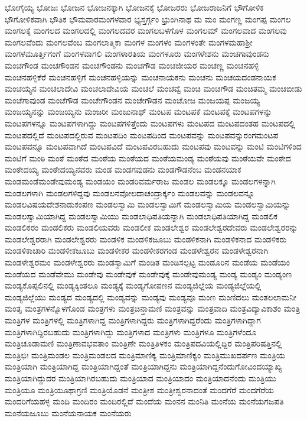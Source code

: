 {ಭೋಗೈಯ್ಯ
ಭೋಜಃ
ಭೋಜನ
ಭೋಜನಕ್ಕಾಗಿ
ಭೋಜನಕ್ಕೆ
ಭೋಜರರು
ಭೋಜರಾಜನಿಗೆ
ಭೌಗೋಳಿಕ
ಭೌಗೋಳಿಕವಾಗಿ
ಭೌತಿಕ
ಭೌಮವಾರಮಂಗಳವಾರ
ಭ್ಯಸ್ತರ್ಗ್ಗಂ
ಭ್ರುಂಗಿನಾಥ
ಮ
ಮಂ
ಮಂಗಣ್ಣ
ಮಂಗಪ್ಪ
ಮಂಗಲ
ಮಂಗಲಕ್ಕೆ
ಮಂಗಲದ
ಮಂಗಲದಲ್ಲಿ
ಮಂಗಲದವರ
ಮಂಗಲಬಳಗೊಳ
ಮಂಗಲಮ್
ಮಂಗಲವಾದ
ಮಂಗಲವು
ಮಂಗಲವೆಂದು
ಮಂಗಲವೆಂಬ
ಮಂಗಲಾತ್ಮಿಕಾ
ಮಂಗಳ
ಮಂಗಳಂ
ಮಂಗಳಂತೇ
ಮಂಗಳಮಹಾಶ್ರೀ
ಮಂಗಳಮೂರ್ತ್ತಿಗಂಗೆ
ಮಂಗಳವಾಗಲಿ
ಮಂಗಳಾರತಿಯ
ಮಂಗಳೂರು
ಮಂಗಳೇಶನು
ಮಂಚಗಾವುಂಡನು
ಮಂಚಗೌಂಡ
ಮಂಚಗೌಂಡನ
ಮಂಚಗೌಂಡನು
ಮಂಚಗೌಡ
ಮಂಚಜೀಯರ
ಮಂಚಣ್ಣ
ಮಂಚನಹಳ್ಳಿ
ಮಂಚನಹಳ್ಳಿಕೆರೆ
ಮಂಚನಹಳ್ಳಿಗೆ
ಮಂಚನಹಳ್ಳಿಯನ್ನು
ಮಂಚನಾಯಕನು
ಮಂಚನು
ಮಂಚಯದಂಡನಾಯಕ
ಮಂಚಯ್ಯನ
ಮಂಚಲಾದೇವಿ
ಮಂಚಲಾದೇವಿಯ
ಮಂಚಲೆ
ಮಂಚವ್ವೆ
ಮಂಚಿ
ಮಂಚಿಗೌಡ
ಮಂಚಿತಮ್ಮ
ಮಂಚಿಬೀಡು
ಮಂಚೆಗಾವುಂಡ
ಮಂಚೆಗೌಡ
ಮಂಚೇಗೌಂಡನ
ಮಂಚೇಗೌಡನ
ಮಂಚೋಜ
ಮಂಜಯಪ್ಪ
ಮಂಜಯ್ಯ
ಮಂಜಯ್ಯನನ್ನು
ಮಂಜಯ್ಯನು
ಮಂಜರೀ
ಮಂಜುನಾಥ್
ಮಂಟಪ
ಮಂಟಪಕೆ
ಮಂಟಪಕ್ಕೆ
ಮಂಟಪಗಳನ್ನು
ಮಂಟಪಗಳನ್ನೂ
ಮಂಟಪಗಳಾಗಿದ್ದು
ಮಂಟಪಗಳಿತ್ತೆಂದು
ಮಂಟಪಗಳು
ಮಂಟಪದ
ಮಂಟಪದಂತಹ
ಮಂಟಪದಲ್ಲಿ
ಮಂಟಪದಲ್ಲಿದೆ
ಮಂಟಪದಲ್ಲಿರುವ
ಮಂಟಪದಿಂ
ಮಂಟಪದಿಂದ
ಮಂಟಪವನ್ನು
ಮಂಟಪವನ್ನುರಂಗಮಂಟಪ
ಮಂಟಪವನ್ನೂ
ಮಂಟಪವಾಗಿದೆ
ಮಂಟಪವಿದೆ
ಮಂಟಪವಿರಬಹುದು
ಮಂಟಪವು
ಮಂಟವನ್ನು
ಮಂಟಿ
ಮಂಟಿಗಳಿಂದ
ಮಂಟಿಗೆ
ಮಂಠಿ
ಮಂಠೆ
ಮಂಠೆದ
ಮಂಠೆಯ
ಮಂಠೆಯದ
ಮಂಠೆಯಮಂಡ್ಯ
ಮಂಠೆಯವು
ಮಂಠೆಯವೇ
ಮಂಠೇದ
ಮಂಠೇದಯ್ಯ
ಮಂಠೇದಯ್ಯನವರು
ಮಂಡ
ಮಂಡಗವುಡನು
ಮಂಡಗೌಡನೆಂಬ
ಮಂಡನಯಾಕ
ಮಂಡಮಂಡೆಮಂಡೇವುಮಂಡ್ಯ
ಮಂಡಯಂ
ಮಂಡರಿವರ್ಮರಾಜ
ಮಂಡಲ
ಮಂಡಲಕ್ಕೂ
ಮಂಡಲಗಳನ್ನಾಗಿ
ಮಂಡಲಗಳಾಗಿ
ಮಂಡಲಗಳಿದ್ದವು
ಮಂಡಲನವೋಲದಾಚಂದ್ರಾರ್ಕ್ಕಂ
ಮಂಡಲವನ್ನು
ಮಂಡಲವನ್ನೂ
ಮಂಡಲವಿಷಯದೇಶನಾಡುಕಂಪಣ
ಮಂಡಲಸ್ವಾಮಿ
ಮಂಡಲಸ್ವಾಮಿಗೆ
ಮಂಡಲಸ್ವಾಮಿಯ
ಮಂಡಲಸ್ವಾಮಿಯನ್ನು
ಮಂಡಲಸ್ವಾಮಿಯಾಗಿದ್ದ
ಮಂಡಲಸ್ವಾಮಿಯು
ಮಂಡಲಾಧಿಪತಿಯನ್ನಾಗಿ
ಮಂಡಲಾಧಿಪತಿಯಾಗಿದ್ದ
ಮಂಡಲಿಕ
ಮಂಡಲಿಕರಂ
ಮಂಡಲಿಕರು
ಮಂಡಲಿಯವರು
ಮಂಡಲೀಕ
ಮಂಡಲೇಶ್ವರ
ಮಂಡಲೇಶ್ವರದೇವರು
ಮಂಡಲೇಶ್ವರರನ್ನು
ಮಂಡಲೇಶ್ವರರಾಗಿ
ಮಂಡಲೇಶ್ವರರು
ಮಂಡಳಿಕ
ಮಂಡಳಿಕಜೂಬು
ಮಂಡಳಿಕನಾಗಿ
ಮಂಡಳಿಕನಾದ
ಮಂಡಳಿಕರು
ಮಂಡಳಿಕಾಚಾರಿ
ಮಂಡಳೀಕಜೂಬು
ಮಂಡಳೀಕರ
ಮಂಡಳೀಕರಗಂಡ
ಮಂಡಳೇಶ್ವರನ
ಮಂಡಳೇಶ್ವರನಾಗಿ
ಮಂಡಳೇಶ್ವರಮಂ
ಮಂಡಳೇಶ್ವರರು
ಮಂಡಸ್ವಾಮಿಗೆ
ಮಂಡಿತ
ಮಂಡಿಸಲ್ಪಟ್ಟ
ಮಂಡೂರಿನ
ಮಂಡೆಯ
ಮಂಡೆಯಂ
ಮಂಡೆಯದ
ಮಂಡೆವೇಮು
ಮಂಡೇವು
ಮಂಡೇವುಕೆ
ಮಂಡೇವುಕ್ಕೆ
ಮಂಡೇವುಮಂಡ್ಯ
ಮಂಡ್ಯ
ಮಂಡ್ಯಂ
ಮಂಡ್ಯಂಣ
ಮಂಡ್ಯಕೊಪ್ಪಲಿನಲ್ಲಿ
ಮಂಡ್ಯಕ್ಕಿಂತಲೂ
ಮಂಡ್ಯಕ್ಕೆ
ಮಂಡ್ಯಗೋಪಣನ
ಮಂಡ್ಯಜಿಲ್ಲೆಯ
ಮಂಡ್ಯಜಿಲ್ಲೆಯಲ್ಲಿ
ಮಂಡ್ಯಜಿಲ್ಲೆಯು
ಮಂಡ್ಯದ
ಮಂಡ್ಯದಲ್ಲಿ
ಮಂಡ್ಯವನ್ನು
ಮಂಡ್ಯವು
ಮಂಡ್ಯವೂ
ಮಂಣ
ಮಂಣಿದಲು
ಮಂತಲಲಾಮನೀ
ಮಂತೃ
ಮಂತ್ರಗಳನ್ನೊಳಗೊಂಡ
ಮಂತ್ರಗಳು
ಮಂತ್ರಚಿನ್ತಾಮಣಿ
ಮಂತ್ರವನ್ನು
ಮಂತ್ರವಾದಿ
ಮಂತ್ರವಿದ್ಯಾವಿಕಾಶಂ
ಮಂತ್ರಿ
ಮಂತ್ರಿಗಳ
ಮಂತ್ರಿಗಳಲ್ಲಿ
ಮಂತ್ರಿಗಳಾಗಿದ್ದ
ಮಂತ್ರಿಗಳಾಗಿದ್ದರು
ಮಂತ್ರಿಗಳಾಗಿದ್ದರೆಂದು
ಮಂತ್ರಿಗಳಾಗಿದ್ದಾಗ
ಮಂತ್ರಿಗಳಾಗಿದ್ದಿರಬಹುದು
ಮಂತ್ರಿಗಳಾಗಿದ್ದು
ಮಂತ್ರಿಗಳಾದ
ಮಂತ್ರಿಗಳು
ಮಂತ್ರಿಗಳೂ
ಮಂತ್ರಿಗಳೆಂದೂ
ಮಂತ್ರಿಚೂಡಾಮಣಿ
ಮಂತ್ರಿಣಾವಭವತಾಂ
ಮಂತ್ರಿಣೇ
ಮಂತ್ರಿತಿಳಕಂ
ಮಂತ್ರಿಪದವಿಯಲ್ಲಿದ್ದಿರ
ಮಂತ್ರಿಪರಿಷತ್ತಿನಲ್ಲಿ
ಮಂತ್ರಿಭಿಃ
ಮಂತ್ರಿಮಂಡಲ
ಮಂತ್ರಿಮಂಡಲದ
ಮಂತ್ರಿಮಾಣಿಕ್ಯ
ಮಂತ್ರಿಮಾಣಿಕ್ಯಂ
ಮಂತ್ರಿಮುಖದರ್ಪಣ
ಮಂತ್ರಿಯ
ಮಂತ್ರಿಯಾಗಿ
ಮಂತ್ರಿಯಾಗಿದ್ದ
ಮಂತ್ರಿಯಾಗಿದ್ದಂತೆ
ಮಂತ್ರಿಯಾಗಿದ್ದನು
ಮಂತ್ರಿಯಾಗಿದ್ದನೆಂದುಗೋವಿಂದಯ್ಯಾಖ್ಯ
ಮಂತ್ರಿಯಾಗಿದ್ದುದರ
ಮಂತ್ರಿಯಾಗಿರಬಹುದು
ಮಂತ್ರಿಯಾದ
ಮಂತ್ರಿಯಾದಂ
ಮಂತ್ರಿಯಾದನೆಂದು
ಮಂತ್ರಿಯು
ಮಂತ್ರಿಯೂ
ಮಂತ್ರಿಯೂಥಾಗ್ರಣಿ
ಮಂತ್ರಿಯೊಡನೆ
ಮಂತ್ರೀಶ
ಮಂತ್ರೀಶ್ವರನಾದಂತೆ
ಮಂದಗೆರೆ
ಮಂದಗೆರೆಯ
ಮಂದರಿಗೆಯಹಳ್ಳ
ಮಂದಿ
ಮಂದಿರಂ
ಮಂದಿರಲ್ಲಿದೆ
ಮಂದೆಯ
ಮಂನನ
ಮಂನಿತಿ
ಮಂನೆಯ
ಮಂನೆಯಗಜಪತಿ
ಮಂನೆಯಜೂಬು
ಮಂನೆಯನಾಯಕ
ಮಂನೆಯರು
}
